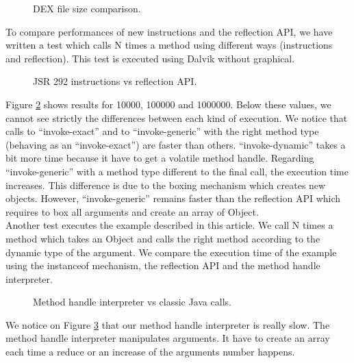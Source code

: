 \documentclass{sig-alternate}
\def \DALVIK{Dalvik\xspace}
\begin{document}
  \begin{figure}[h]
    \dataset
    \resizebox{\linewidth}{!}{}
    \caption{DEX file size comparison.}
    \label{Rsize}
  \end{figure}

  To compare performances of new instructions and the reflection API,
  we have written a test which calls N times a method using different ways (instructions and reflection).
  This test is executed using \DALVIK without graphical.

  \begin{figure}[!h]
    \resizebox{\linewidth}{!}{}
    \caption{JSR 292 instructions vs reflection API.}
    \label{Rinvoke}
  \end{figure}

  Figure \ref{Rinvoke} shows results for 10000, 100000 and 1000000.
  Below these values, we cannot see strictly the differences between each kind of execution.
  We notice that calls to ``invoke-exact'' and to ``invoke-generic'' with the right method type (behaving as an ``invoke-exact'') are faster than others.
  ``invoke-dynamic'' takes a bit more time because it have to get a volatile method handle.
  Regarding ``invoke-generic'' with a method type different to the final call, the execution time increases.
  This difference is due to the boxing mechanism which creates new objects.
  However, ``invoke-generic'' remains faster than the reflection API which requires to box all arguments and create an array of Object.\\
  
  Another test executes the example described in this article.
  We call N times a method which takes an Object and calls the right method according to the dynamic type of the argument.
  We compare the execution time of the example using the instanceof mechanism, the reflection API and the method handle interpreter.

  \begin{figure}[!h]
    \resizebox{\linewidth}{!}{}
    \caption{Method handle interpreter vs classic Java calls.}\vspace{-1em}
    \label{Rmutable}
  \end{figure}

  We notice on Figure \ref{Rmutable} that our method handle interpreter is really slow.
  The method handle interpreter manipulates arguments.
  It have to create an array each time a reduce or an increase of the arguments number happens.
\end{document}
